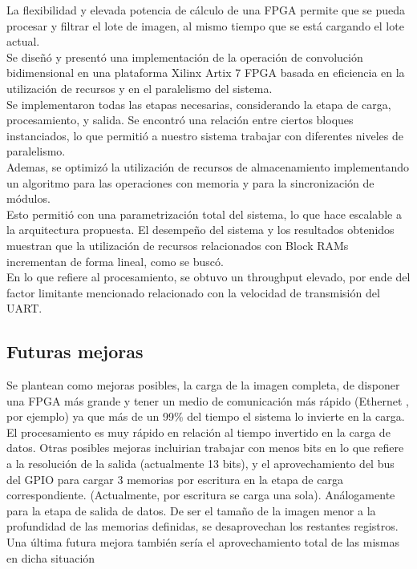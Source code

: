 \documentclass[]{IEEEphot}
\begin{document}
La flexibilidad y elevada potencia de cálculo de una FPGA permite que se pueda
procesar y filtrar el lote de imagen, al mismo tiempo que se está cargando el lote
actual. \\

Se diseñó y presentó una implementación de la operación de convolución bidimensional en una
plataforma Xilinx Artix 7 FPGA basada en eficiencia en la utilización de recursos y en el paralelismo del sistema.\\
Se implementaron todas las etapas necesarias, considerando la etapa de carga, procesamiento, y salida. Se
encontró una relación entre ciertos bloques instanciados, lo que permitió a nuestro sistema trabajar con diferentes
niveles de paralelismo.\\

Ademas, se optimizó la utilización de recursos de almacenamiento implementando un algoritmo para las
operaciones con memoria y para la sincronización de módulos.\\
Esto permitió con una parametrización total del sistema, lo que hace escalable a la arquitectura propuesta.
El desempeño del sistema y los resultados obtenidos muestran que la utilización de recursos relacionados con
Block RAMs incrementan de forma lineal, como se buscó.\\

En lo que refiere al procesamiento, se obtuvo un throughput elevado, por ende del factor limitante mencionado relacionado 
con la velocidad de transmisión del UART.

\subsection{Futuras mejoras}
Se plantean como mejoras posibles, la carga de la imagen completa, de disponer una FPGA más grande y tener un medio de comunicación más rápido (Ethernet , por ejemplo) 
ya que más de un 99$\%$ del tiempo el sistema lo invierte en la carga. El procesamiento es muy rápido en relación al tiempo invertido en la carga de datos.
Otras posibles mejoras incluirian trabajar con menos bits en lo que refiere a la resolución de la salida (actualmente 13 bits),  y el aprovechamiento del bus del GPIO para cargar 3 memorias por escritura en la etapa 
de carga correspondiente. (Actualmente, por escritura se carga una sola). Análogamente para la etapa de salida de datos.
De ser el tamaño de la imagen menor a la profundidad de las memorias definidas, se desaprovechan los restantes registros. 
Una última  futura mejora también sería el aprovechamiento total de las mismas en dicha situación
\end{document}
